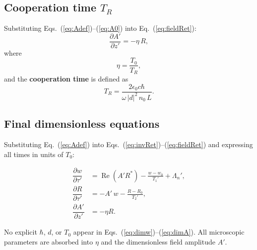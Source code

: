\documentclass[12pt,a4paper]{article}
\newcommand{\T}{T_0}
\newcommand{\pderiv}[2]{\dfrac{\partial #1}{\partial #2}}
\begin{document}
\subsection{Cooperation time $T_R$}

Substituting Eqs.~(\ref{eq:Adef})--(\ref{eq:A0}) into
Eq.~(\ref{eq:fieldRet}):
\begin{equation}
  \pderiv{A'}{z'} = -\eta\,R,
\end{equation}
where
\begin{equation}
  \eta = \frac{\T}{T_R},
  \label{eq:eta}
\end{equation}
and the \textbf{cooperation time} is defined as
\begin{equation}
  \boxed{T_R = \frac{2\epsilon_0 c\hbar}{\omega\,|d|^2\,n_0\,L}.}
  \label{eq:TR}
\end{equation}

\subsection{Final dimensionless equations}

Substituting Eq.~(\ref{eq:Adef}) into
Eqs.~(\ref{eq:invRet})--(\ref{eq:fieldRet}) and expressing all times in
units of $\T$:

\begin{resultbox}
\begin{align}
  \pderiv{w}{\tau'}
    &= \operatorname{Re}(A'R^*)
       - \frac{w - w_0}{T_1'}
       + \Lambda_n',
  \label{eq:dimw}\\[8pt]
  \pderiv{R}{\tau'}
    &= -A'\,w - \frac{R-R_0}{T_2'},
  \label{eq:dimR}\\[8pt]
  \pderiv{A'}{z'}
    &= -\eta R.
  \label{eq:dimA}
\end{align}
\end{resultbox}

\begin{notebox}
  No explicit $\hbar$, $d$, or $\T$ appear in
  Eqs.~(\ref{eq:dimw})--(\ref{eq:dimA}).
  All microscopic parameters are absorbed into $\eta$
  and the dimensionless field amplitude $A'$.
\end{notebox}
\end{document}
